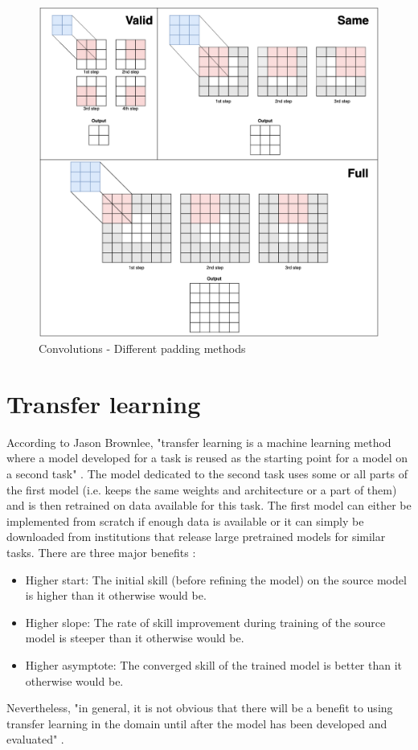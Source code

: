 \begin{figure}[!h]
\centering
\includegraphics[width=1\textwidth, keepaspectratio=true]{./figures/convolution_padding.png}
\caption{Convolutions - Different padding methods}
\label{fig:convolution_padding}
\end{figure}



\section{Transfer learning}
\setlength{\marginparwidth}{3cm}\leavevmode {}According to Jason Brownlee, "transfer learning is a machine learning method where a model developed for a task is reused as the starting point for a model on a second task" \cite{30}. The model dedicated to the second task uses some or all parts of the first model (i.e. keeps the same weights and architecture or a part of them) and is then retrained on data available for this task. The first model can either be implemented from scratch if enough data is available or it can simply be downloaded from institutions that release large pretrained models for similar tasks. There are three major benefits \cite{30}:
\begin{itemize}
\item Higher start: The initial skill (before refining the model) on the source model is higher than it otherwise would be.
\item Higher slope: The rate of skill improvement during training of the source model is steeper than it otherwise would be.
\item Higher asymptote: The converged skill of the trained model is better than it otherwise would be.
\end{itemize}
Nevertheless, "in general, it is not obvious that there will be a benefit to using transfer learning in the domain until after the model has been developed and evaluated" \cite{30}.

